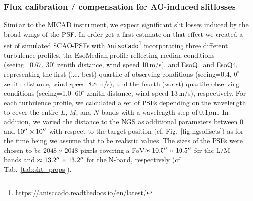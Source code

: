 \subsubsection{Flux calibration / compensation for AO-induced slitlosses}\label{ssec:aoslitloss}
Similar to the MICAD instrument, we expect significant slit losses induced by the broad wings of the \ac{PSF}. In order get a first estimate on that effect we created a set of simulated \ac{SCAO}-\ac{PSF}s with \texttt{AnisoCado}\footnote{\url{https://anisocado.readthedocs.io/en/latest/}} incorporating three different turbulence profiles, the EsoMedian profile reflecting median conditions (seeing=0.67\arcsec, $30^\circ$ zenith distance, wind speed 10\,m/s), and EsoQ1 and EsoQ4, representing the first (i.e. best) quartile of observing conditions (seeing=0.4\arcsec, $0^\circ$ zenith distance, wind speed 8.8\,m/s), and the fourth (worst) quartile observing conditions  (seeing=1.0\arcsec, $60^\circ$ zenith distance, wind speed 13\,m/s), respectively. For each turbulence profile, we calculated a set of \ac{PSF}s depending on the wavelength to cover the entire $L$, $M$, and $N$-bands with a wavelength step of 0.1$\mu$m. In addition, we varied the distance to the \ac{NGS} as additional parameters between 0 and $10\hbox{$^{\prime\prime}$}\times10\hbox{$^{\prime\prime}$}$ with respect to the target position (cf. Fig.~\ref{fig:ngsoffsets}) as for the time being we assume that to be realistic values. The sizes of the \ac{PSF}s were chosen to be $2048\times2048$ pixels covering a \ac{FoV}$\approx10.5\hbox{$^{\prime\prime}$}\times10.5\hbox{$^{\prime\prime}$}$ for the L/M bands and $\approx13.2\hbox{$^{\prime\prime}$}\times13.2\hbox{$^{\prime\prime}$}$ for the N-band, respectively (cf. Tab.~\ref{tab:slit_props}). \\

